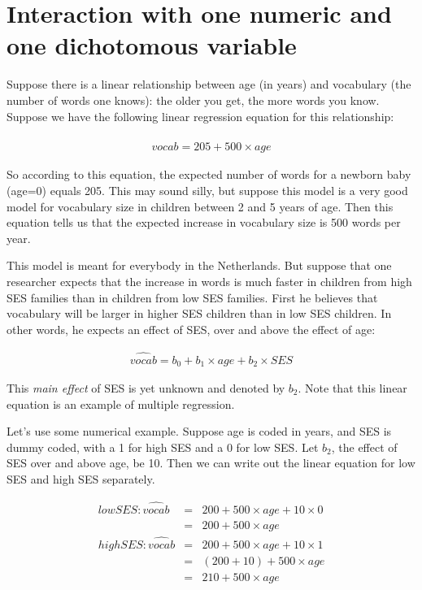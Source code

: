 \documentclass[]{book}\usepackage[]{graphicx}\usepackage[]{color}
\begin{document}
\section{Interaction with one numeric and one dichotomous variable}

Suppose there is a linear relationship between age (in years) and vocabulary (the number of words one knows): the older you get, the more words you know. Suppose we have the following linear regression equation for this relationship:


\begin{eqnarray}
\widehat{vocab} = 205 + 500 \times age 
\end{eqnarray}

So according to this equation, the expected number of words for a newborn baby (age=0) equals 205. This may sound silly, but suppose this model is a very good model for vocabulary size in children between 2 and 5 years of age. Then this equation tells us that the expected increase in vocabulary size is 500 words per year.

This model is meant for everybody in the Netherlands. But suppose that one researcher expects that the increase in words is much faster in children from high SES families than in children from low SES families. First he believes that vocabulary will be larger in higher SES children than in low SES children. In other words, he expects an effect of SES, over and above the effect of age:

\begin{eqnarray}
\widehat{vocab} = b_0 + b_1 \times age + b_2 \times SES
\end{eqnarray}

This \textit{main effect} of SES is yet unknown and denoted by $b_2$. Note that this linear equation is an example of multiple regression.


Let's use some numerical example. Suppose age is coded in years, and SES is dummy coded, with a 1 for high SES and a 0 for low SES. Let $b_2$, the effect of SES over and above age, be 10. Then we can write out the linear equation for low SES and high SES separately.


\begin{eqnarray}
low SES: \widehat{vocab} &=& 200 + 500 \times age + 10 \times 0  \\
&=& 200 + 500 \times age \\
high SES: \widehat{vocab} &=& 200 + 500 \times age + 10 \times 1  \\
&=& (200+10) + 500 \times age \\
&=& 210 + 500 \times age
\end{eqnarray}
\end{document}
